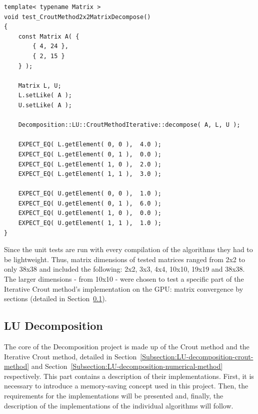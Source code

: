 \begin{lstlisting}[caption={Implementation of the test where a 2x2 \code{DenseMatrix} instance is decomposed. As mentioned before, the matrix decomposed in this test is small and therefore the decomposed $ \mathbb{L} $ and $ \mathbb{U} $ matrices are expected to be exact solutions rather than within some range of the exact solution. Taken from the Decomposition project repository on GitLab\protect\footref{Footnote:decomposition-project-gitlab-url}.},label={Listing:implementation-decomposition-project-unit-tests-2x2-matrix-decomposition-test}]
template< typename Matrix >
void test_CroutMethod2x2MatrixDecompose()
{
	const Matrix A( {
		{ 4, 24 },
		{ 2, 15 }
	} );
	
	Matrix L, U;
	L.setLike( A );
	U.setLike( A );
	
	Decomposition::LU::CroutMethodIterative::decompose( A, L, U );
	
	EXPECT_EQ( L.getElement( 0, 0 ),  4.0 );
	EXPECT_EQ( L.getElement( 0, 1 ),  0.0 );
	EXPECT_EQ( L.getElement( 1, 0 ),  2.0 );
	EXPECT_EQ( L.getElement( 1, 1 ),  3.0 );

	EXPECT_EQ( U.getElement( 0, 0 ),  1.0 );
	EXPECT_EQ( U.getElement( 0, 1 ),  6.0 );
	EXPECT_EQ( U.getElement( 1, 0 ),  0.0 );
	EXPECT_EQ( U.getElement( 1, 1 ),  1.0 );
}

\end{lstlisting}

Since the unit tests are run with every compilation of the algorithms they had to be lightweight. Thus, matrix dimensions of tested matrices ranged from 2x2 to only 38x38 and included the following: 2x2, 3x3, 4x4, 10x10, 19x19 and 38x38. The larger dimensions - from 10x10 - were chosen to test a specific part of the Iterative Crout method's implementation on the GPU: matrix convergence by sections (detailed in Section~\ref{Subsection:implementation-decomposition-project-lu-decomposition}).


\subsection{LU Decomposition \TO}\label{Subsection:implementation-decomposition-project-lu-decomposition}
The core of the Decomposition project is made up of the Crout method and the Iterative Crout method, detailed in Section~\ref{Subsection:LU-decomposition-crout-method} and Section~\ref{Subsection:LU-decomposition-numerical-method} respectively. This part contains a description of their implementations. First, it is necessary to introduce a memory-saving concept used in this project. Then, the requirements for the implementations will be presented and, finally, the description of the implementations of the individual algorithms will follow.

